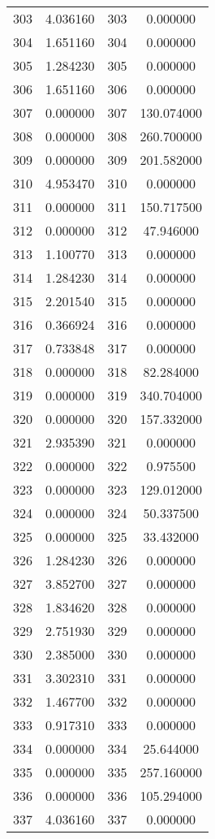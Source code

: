 \documentclass[12pt]{article}
\begin{document}
\begin{longtable}{@{}cccc@{}}
303 & 4.036160 & 303 & 0.000000 \\
304 & 1.651160 & 304 & 0.000000 \\
305 & 1.284230 & 305 & 0.000000 \\
306 & 1.651160 & 306 & 0.000000 \\
307 & 0.000000 & 307 & 130.074000 \\
308 & 0.000000 & 308 & 260.700000 \\
309 & 0.000000 & 309 & 201.582000 \\
310 & 4.953470 & 310 & 0.000000 \\
311 & 0.000000 & 311 & 150.717500 \\
312 & 0.000000 & 312 & 47.946000 \\
313 & 1.100770 & 313 & 0.000000 \\
314 & 1.284230 & 314 & 0.000000 \\
315 & 2.201540 & 315 & 0.000000 \\
316 & 0.366924 & 316 & 0.000000 \\
317 & 0.733848 & 317 & 0.000000 \\
318 & 0.000000 & 318 & 82.284000 \\
319 & 0.000000 & 319 & 340.704000 \\
320 & 0.000000 & 320 & 157.332000 \\
321 & 2.935390 & 321 & 0.000000 \\
322 & 0.000000 & 322 & 0.975500 \\
323 & 0.000000 & 323 & 129.012000 \\
324 & 0.000000 & 324 & 50.337500 \\
325 & 0.000000 & 325 & 33.432000 \\
326 & 1.284230 & 326 & 0.000000 \\
327 & 3.852700 & 327 & 0.000000 \\
328 & 1.834620 & 328 & 0.000000 \\
329 & 2.751930 & 329 & 0.000000 \\
330 & 2.385000 & 330 & 0.000000 \\
331 & 3.302310 & 331 & 0.000000 \\
332 & 1.467700 & 332 & 0.000000 \\
333 & 0.917310 & 333 & 0.000000 \\
334 & 0.000000 & 334 & 25.644000 \\
335 & 0.000000 & 335 & 257.160000 \\
336 & 0.000000 & 336 & 105.294000 \\
337 & 4.036160 & 337 & 0.000000 \\

\end{longtable}
\end{document}

